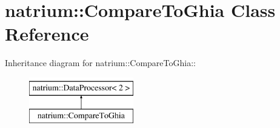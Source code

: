 \hypertarget{classnatrium_1_1CompareToGhia}{
\section{natrium::CompareToGhia Class Reference}
\label{classnatrium_1_1CompareToGhia}
}
Inheritance diagram for natrium::CompareToGhia::\begin{figure}[H]
\begin{center}
\leavevmode
\includegraphics[height=2cm]{classnatrium_1_1CompareToGhia}
\end{center}
\end{figure}

